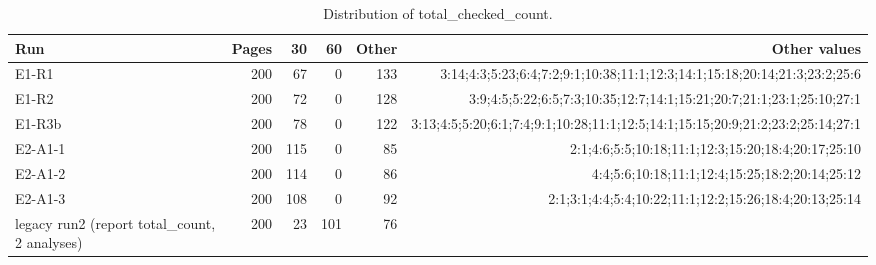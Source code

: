 \begin{table}[t]
\centering
\small
\caption{Distribution of total\_checked\_count.}
\label{tab:e7-tcc}
\begin{tabular}{lrrrrr}
\toprule
Run & Pages & 30 & 60 & Other & Other values \\
\midrule
E1-R1 & 200 & 67 & 0 & 133 & 3:14;4:3;5:23;6:4;7:2;9:1;10:38;11:1;12:3;14:1;15:18;20:14;21:3;23:2;25:6 \\
E1-R2 & 200 & 72 & 0 & 128 & 3:9;4:5;5:22;6:5;7:3;10:35;12:7;14:1;15:21;20:7;21:1;23:1;25:10;27:1 \\
E1-R3b & 200 & 78 & 0 & 122 & 3:13;4:5;5:20;6:1;7:4;9:1;10:28;11:1;12:5;14:1;15:15;20:9;21:2;23:2;25:14;27:1 \\
E2-A1-1 & 200 & 115 & 0 & 85 & 2:1;4:6;5:5;10:18;11:1;12:3;15:20;18:4;20:17;25:10 \\
E2-A1-2 & 200 & 114 & 0 & 86 & 4:4;5:6;10:18;11:1;12:4;15:25;18:2;20:14;25:12 \\
E2-A1-3 & 200 & 108 & 0 & 92 & 2:1;3:1;4:4;5:4;10:22;11:1;12:2;15:26;18:4;20:13;25:14 \\
legacy run2 (report total\_count, 2 analyses) & 200 & 23 & 101 & 76 &  \\
\bottomrule
\end{tabular}
\end{table}
